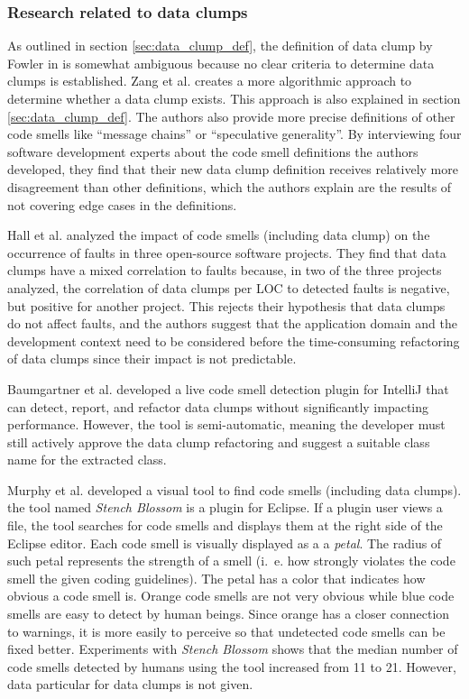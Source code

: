 \subsubsection{Research related to data clumps}

As outlined in section \ref{sec:data_clump_def}, the definition of data clump by Fowler in \cite{fowler2019refactoring} is somewhat ambiguous because no clear criteria to determine data clumps is established. Zang et al. \cite{zhangImprovingPrecisionFowler2008} creates a more algorithmic approach to determine whether a data clump exists. This approach is also explained in section \ref{sec:data_clump_def}. The authors also provide more precise definitions of other code smells like \enquote{message chains} or \enquote{speculative generality}. By interviewing four software development experts about the code smell definitions the authors developed, they find that their new data clump definition receives relatively more disagreement than other definitions, which the authors explain are the results of not covering edge cases in the definitions. 


Hall et al. analyzed the impact of code smells (including data clump) on the occurrence of faults in three open-source software projects. They find that data clumps have a mixed correlation to faults because, in two of the three projects analyzed, the correlation of data clumps per \ac{LOC} to detected faults is negative, but positive for another project. This rejects their hypothesis that data clumps do not affect faults, and the authors suggest that the application domain and the development context need to be considered before the time-consuming refactoring of data clumps since their impact is not predictable.  \cite{hallCodeSmellsHave2014}


Baumgartner et al. developed a live code smell detection plugin for IntelliJ that can detect, report, and refactor data clumps without significantly impacting performance. However, the tool is semi-automatic, meaning the developer must still actively approve the data clump refactoring and suggest a suitable class name for the extracted class. \cite{BaumgartnerAP23}

Murphy et al. \cite{stench_blossom} developed a visual tool to find code smells (including data clumps). the tool named \textit{Stench Blossom} is a plugin for Eclipse. If a plugin user views a file, the tool searches for code smells and displays them at the right side of the Eclipse editor. Each code smell is visually displayed as a a \textit{petal}. The radius of such petal represents the strength of a smell (i.~e. how strongly violates the code smell the given coding guidelines). The petal has a color that indicates how obvious a code smell is. Orange code smells are not very obvious while blue code smells are easy to detect by human beings. Since orange has a closer connection to warnings, it is more easily to perceive so that undetected code smells can be fixed better. Experiments with \textit{Stench Blossom} shows that the median number of code smells detected by humans using the tool increased from 11 to 21. However, data particular for data clumps is not given.




